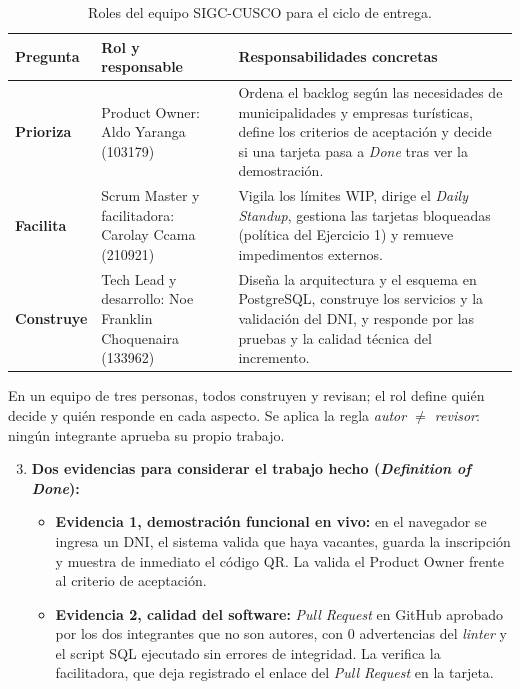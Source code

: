 \documentclass[11pt,a4paper]{article}
\begin{document}
\begin{table}[H]
\centering
\small
\renewcommand{\arraystretch}{1.25}
\begin{tabularx}{\textwidth}{P{1.9cm}P{3.3cm}Y}
\toprule
\textbf{Pregunta} & \textbf{Rol y responsable} & \textbf{Responsabilidades concretas} \\
\midrule
\textbf{Prioriza} & Product Owner: Aldo Yaranga (103179) & Ordena el backlog según las necesidades de municipalidades y empresas turísticas, define los criterios de aceptación y decide si una tarjeta pasa a \textit{Done} tras ver la demostración. \\
\midrule
\textbf{Facilita} & Scrum Master y facilitadora: Carolay Ccama (210921) & Vigila los límites WIP, dirige el \textit{Daily Standup}, gestiona las tarjetas bloqueadas (política del Ejercicio 1) y remueve impedimentos externos. \\
\midrule
\textbf{Construye} & Tech Lead y desarrollo: Noe Franklin Choquenaira (133962) & Diseña la arquitectura y el esquema en PostgreSQL, construye los servicios y la validación del DNI, y responde por las pruebas y la calidad técnica del incremento. \\
\bottomrule
\end{tabularx}
\caption{Roles del equipo SIGC-CUSCO para el ciclo de entrega.}
\label{tab:roles}
\end{table}

En un equipo de tres personas, todos construyen y revisan; el rol define quién decide y quién responde en cada aspecto. Se aplica la regla \textit{autor $\neq$ revisor}: ningún integrante aprueba su propio trabajo.

\begin{enumerate}
\setcounter{enumi}{2}
    \item \textbf{Dos evidencias para considerar el trabajo hecho (\textit{Definition of Done}):}
    \begin{itemize}\setlength\itemsep{0.2em}
        \item \textbf{Evidencia 1, demostración funcional en vivo:} en el navegador se ingresa un DNI, el sistema valida que haya vacantes, guarda la inscripción y muestra de inmediato el código QR. La valida el Product Owner frente al criterio de aceptación.
        \item \textbf{Evidencia 2, calidad del software:} \textit{Pull Request} en GitHub aprobado por los dos integrantes que no son autores, con 0 advertencias del \textit{linter} y el script SQL ejecutado sin errores de integridad. La verifica la facilitadora, que deja registrado el enlace del \textit{Pull Request} en la tarjeta.
    \end{itemize}
\end{enumerate}
\end{document}
